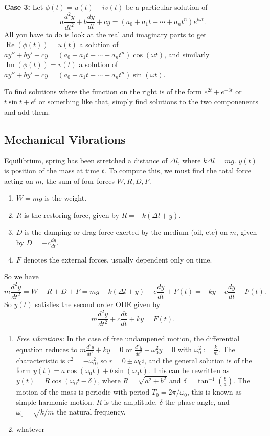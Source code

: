 \noindent\textbf{Case 3:} Let $\phi(t)=u(t)+iv(t)$ be a particular solution of  \[
    a \frac{d^2y}{dt^2}+b \frac{dy}{dt}+cy=(a_0+a_1t+\cdots+a_nt^n)e^{i\omega t}.
\] All you have to do is look at the real and imaginary parts to get $\operatorname{Re}(\phi(t))=u(t)$ a solution of $ay''+by'+cy=(a_0+a_1t+\cdots+a_nt^n)\cos(\omega t)$, and similarly $\operatorname{Im}(\phi(t))=v(t)$ a solution of $ay''+by'+cy=(a_0+a_1t+\cdots+a_nt^n)\sin(\omega t)$.
\begin{remark}
    To find solutions where the function on the right is of the form $e^{2t}+e^{-3t}$ or $t\sin t +e^{t}$ or something like that, simply find solutions to the two componenents and add them.
\end{remark}

\subsection{Mechanical Vibrations}
Equilibrium, spring has been stretched a distance of $\Delta l$, where $k\Delta l=mg$. $y(t)$ is position of the mass at time $t$. To compute this, we must find the total force acting on $m$, the sum of four forces $W,R,D,F$.
\begin{enumerate}[label=(\roman*)]
    \item $W=mg$ is the weight.
    \item $R$ is the restoring force, given by $R=-k(\Delta l+y)$.
    \item $D$ is the damping or drag force exerted by the medium (oil, etc) on $m$, given by $D=-c \frac{dy}{dt}$.
    \item $F$ denotes the external forces, usually dependent only on time.
\end{enumerate}
So we have \[
    m \frac{d^2 y}{dt^2}=W+R+D+F=mg-k(\Delta l+y)-c \frac{dy}{dt}+F(t)=-ky-c \frac{dy}{dt}+F(t).
\] So $y(t)$ satisfies the second order ODE given by \[
m \frac{d^2y}{dt^2}+c \frac{dt}{dt}+ky=F(t).
\] 
\begin{enumerate}[label=(\alph*)]
    \item \emph{Free vibrations:} In the case of free undampened motion, the differential equation reduces to $m \frac{d^2y}{dt^2}+ky=0$ or $\frac{d^2y}{dt^2}+\omega_0^2y=0$ with $\omega_0^2:= \frac{k}{m}$. The characteristic is $r^2=-\omega_0^2$, so $r=0\pm \omega_0i$, and the general solution is of the form $y(t)=a \cos (\omega_0 t)+b \sin (\omega_0 t)$. This can be rewritten as $y(t)=R \cos (\omega_0 t-\delta)$, where $R=\sqrt{a^2+b^2} $ and $\delta= \tan^{-1} \left( \frac{b}{a} \right) .$ The motion of the mass is periodic with period $T_0=2\pi /\omega_0$, this is known as simple harmonic motion. $R$ is the amplitude, $\delta$ the phase angle, and $\omega_0= \sqrt{k /m} $ the natural frequency.
    \item whatever
\end{enumerate}

